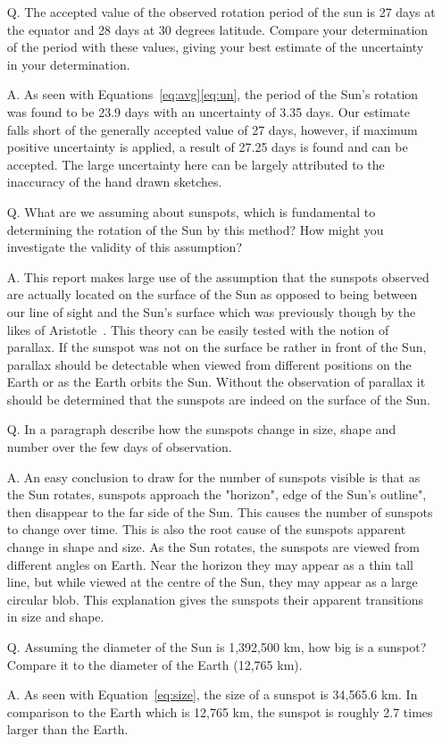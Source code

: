 \documentclass{article}
\begin{document}
\begin{enumerate}
\item[Q.] The accepted value of the observed rotation period of the sun is 27 days at the equator and 28 days
at 30 degrees latitude. Compare your determination of the period with these values, giving your best estimate
of the uncertainty in your determination.
\item[A.] As seen with Equations~\ref{eq:avg}\ref{eq:un}, the period of the Sun's rotation was found to be
23.9 days with an uncertainty of 3.35 days. Our estimate falls short of the generally accepted value of 27 days,
however, if maximum positive uncertainty is applied, a result of 27.25 days is found and can be accepted. The
large uncertainty here can be largely attributed to the inaccuracy of the hand drawn sketches.
\item[Q.] What are we assuming about sunspots, which is fundamental to determining the rotation of the Sun
by this method? How might you investigate the validity of this assumption?
\item[A.] This report makes large use of the assumption that the sunspots observed are actually located on
the surface of the Sun as opposed to being between our line of sight and the Sun's surface which was previously
though by the likes of Aristotle~\cite{Aristotle:2012}. This theory can be easily tested with the notion of parallax.
If the sunspot was not on the surface be rather in front of the Sun, parallax should be detectable when viewed from
different positions on the Earth or as the Earth orbits the Sun. Without the observation of parallax it should be
determined that the sunspots are indeed on the surface of the Sun.
\item[Q.] In a paragraph describe how the sunspots change in size, shape and number over the few days of observation.
\item[A.] An easy conclusion to draw for the number of sunspots visible is that as the Sun rotates, sunspots approach
the "horizon", edge of the Sun's outline", then disappear to the far side of the Sun. This causes the number of sunspots
to change over time. This is also the root cause of the sunspots apparent change in shape and size. As the Sun rotates,
the sunspots are viewed from different angles on Earth. Near the horizon they may appear as a thin tall line, but 
while viewed at the centre of the Sun, they may appear as a large circular blob. This explanation gives the sunspots
their apparent transitions in size and shape.
\item[Q.] Assuming the diameter of the Sun is 1,392,500 km, how big is a sunspot? Compare it to the diameter
of the Earth (12,765 km).
\item[A.] As seen with Equation~\ref{eq:size}, the size of a sunspot is 34,565.6 km. In comparison to the Earth
which is 12,765 km, the sunspot is roughly 2.7 times larger than the Earth.
\end{enumerate}
\end{document}
